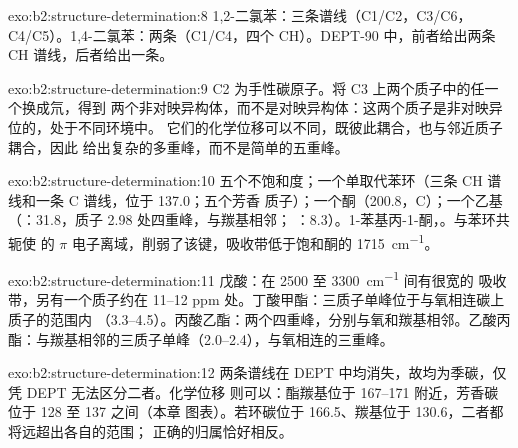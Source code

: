 \begin{solution}{exo:b2:structure-determination:8}
1,2-二氯苯：三条谱线（C1/C2，C3/C6，C4/C5）。1,4-二氯苯：两条（C1/C4，四个
CH）。DEPT-90 中，前者给出两条 CH 谱线，后者给出一条。
\end{solution}

\begin{solution}{exo:b2:structure-determination:9}
C2 为手性碳原子。将 C3 上两个质子中的任一个换成氘，得到
两个非对映异构体，而不是对映异构体：这两个质子是非对映异位的，处于不同环境中。
它们的化学位移可以不同，既彼此耦合，也与邻近质子耦合，因此
 给出复杂的多重峰，而不是简单的五重峰。
\end{solution}

\begin{solution}{exo:b2:structure-determination:10}
五个不饱和度；一个单取代苯环（三条 CH 谱线和一条 C 谱线，位于 137.0；五个芳香
质子）；一个酮（200.8，C）；一个乙基（：31.8，质子 2.98 处四重峰，与羰基相邻；
：8.3）。1-苯基丙-1-酮，。与苯环共轭使  的
$\pi$ 电子离域，削弱了该键，吸收带低于饱和酮的 \qty{1715}{cm^{-1}}。
\end{solution}

\begin{solution}{exo:b2:structure-determination:11}
戊酸：在 2500 至 \qty{3300}{cm^{-1}} 间有很宽的  吸收带，另有一个质子约在 11--12
ppm 处。丁酸甲酯：三质子单峰位于与氧相连碳上质子的范围内
（3.3--4.5）。丙酸乙酯：两个四重峰，分别与氧和羰基相邻。乙酸丙
酯：与羰基相邻的三质子单峰（2.0--2.4），与氧相连的三重峰。
\end{solution}

\begin{solution}{exo:b2:structure-determination:12}
两条谱线在 DEPT 中均消失，故均为季碳，仅凭 DEPT 无法区分二者。化学位移
则可以：酯羰基位于 167--171 附近，芳香碳位于 128 至 137 之间（本章
图表）。若环碳位于 166.5、羰基位于 130.6，二者都将远超出各自的范围；
正确的归属恰好相反。
\end{solution}

